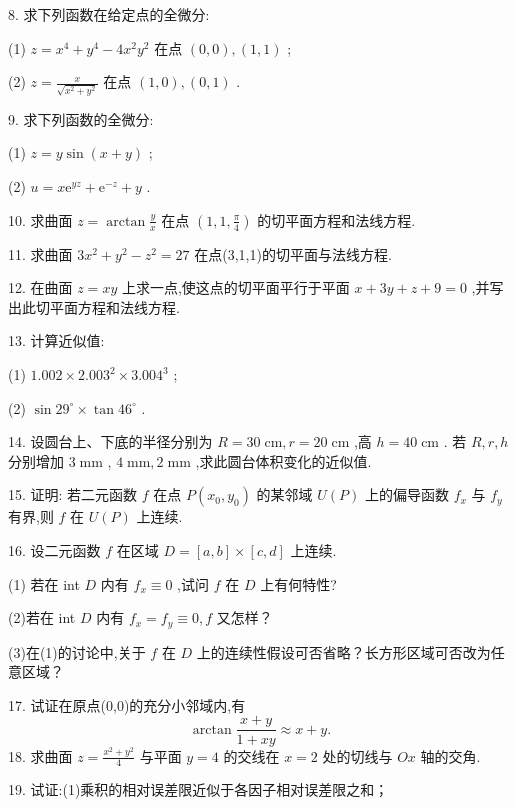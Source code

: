 8. 求下列函数在给定点的全微分:

(1) \(z = {x}^{4} + {y}^{4} - 4{x}^{2}{y}^{2}\) 在点 \(\left( {0,0}\right) ,\left( {1,1}\right)\) ;

(2) \(z = \frac{x}{\sqrt{{x}^{2} + {y}^{2}}}\) 在点 \(\left( {1,0}\right) ,\left( {0,1}\right)\) .

9. 求下列函数的全微分:

(1) \(z = y\sin \left( {x + y}\right)\) ;

(2) \(u = x{\mathrm{e}}^{yz} + {\mathrm{e}}^{-z} + y\) .

10. 求曲面 \(z = \arctan \frac{y}{x}\) 在点 \(\left( {1,1,\frac{\pi }{4}}\right)\) 的切平面方程和法线方程.

11. 求曲面 \(3{x}^{2} + {y}^{2} - {z}^{2} = {27}\) 在点(3,1,1)的切平面与法线方程.

12. 在曲面 \(z = {xy}\) 上求一点,使这点的切平面平行于平面 \(x + {3y} + z + 9 = 0\) ,并写出此切平面方程和法线方程.

13. 计算近似值:

(1) \({1.002} \times  {2.003}^{2} \times  {3.004}^{3}\) ;

(2) \(\sin {29}^{ \circ  } \times  \tan {46}^{ \circ  }\) .

14. 设圆台上、下底的半径分别为 \(R = {30}\mathrm{\;{cm}},r = {20}\mathrm{\;{cm}}\) ,高 \(h = {40}\mathrm{\;{cm}}\) . 若 \(R,r,h\) 分别增加 \(3\mathrm{\;{mm}}\) , \(4\mathrm{\;{mm}},2\mathrm{\;{mm}}\) ,求此圆台体积变化的近似值.

15. 证明: 若二元函数 \(f\) 在点 \(P\left( {{x}_{0},{y}_{0}}\right)\) 的某邻域 \(U\left( P\right)\) 上的偏导函数 \({f}_{x}\) 与 \({f}_{y}\) 有界,则 \(f\) 在 \(U\left( P\right)\) 上连续.

16. 设二元函数 \(f\) 在区域 \(D = \left\lbrack  {a,b}\right\rbrack   \times  \left\lbrack  {c,d}\right\rbrack\) 上连续.

(1) 若在 int \(D\) 内有 \({f}_{x} \equiv  0\) ,试问 \(f\) 在 \(D\) 上有何特性?

(2)若在 int \(D\) 内有 \({f}_{x} = {f}_{y} \equiv  0,f\) 又怎样？

(3)在(1)的讨论中,关于 \(f\) 在 \(D\) 上的连续性假设可否省略？长方形区域可否改为任意区域？

17. 试证在原点(0,0)的充分小邻域内,有
\[
\arctan \frac{x + y}{1 + {xy}} \approx  x + y.
\]
18. 求曲面 \(z = \frac{{x}^{2} + {y}^{2}}{4}\) 与平面 \(y = 4\) 的交线在 \(x = 2\) 处的切线与 \({Ox}\) 轴的交角.

19. 试证:(1)乘积的相对误差限近似于各因子相对误差限之和；

